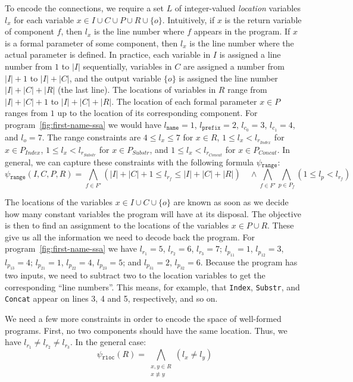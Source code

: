 To encode the connections, we require a set $L$ of integer-valued
\textit{location} variables $l_x$ for each variable $x \in I \cup C \cup P \cup
R \cup \{o\}$. Intuitively, if $x$ is the return variable of component $f$, then
$l_x$ is the line number where $f$ appears in the program. If $x$ is a formal
parameter of some component, then $l_x$ is the line number where the actual
parameter is defined. In practice, each variable in $I$ is assigned a line
number from $1$ to $|I|$ sequentially, variables in $C$ are assigned
a number from $|I| + 1$ to $|I| + |C|$, and the output variable $\{o\}$ is assigned the
line number $|I| + |C| + |R|$ (the last line). The locations of variables in $R$
range from $|I| + |C| + 1$ to $|I| + |C| + |R|$. The location of each formal
parameter $x \in P$ ranges from $1$ up to the location of its corresponding
component.
For program~\ref{fig:first-name-ssa} we would have
$l_{\mathtt{name}} = 1$, $l_{\mathtt{prefix}} = 2$,
$l_{c_0} = 3$, $l_{c_1} = 4$,
and $l_o = 7$.
The range constraints are
$4 \leq l_x \leq 7$ for $x \in R$,
$1 \leq l_x < l_{r_{Index}}$ for $x \in P_{Index}$,
$1 \leq l_x < l_{r_{Substr}}$ for $x \in P_{Substr}$, and
$1 \leq l_x < l_{r_{Concat}}$ for $x \in P_{Concat}$.
In general, we can capture these constraints with the following formula
$\psi{}_{\mathtt{range}}$:
%
\[
  \psi{}_{\mathtt{range}}(I, C, P, R) =
  \bigwedge_{f \in F'} (|I| + |C| + 1 \leq l_{r_f} \leq |I| + |C| + |R|)
  \quad \wedge
  \bigwedge_{f \in F'}
  \bigwedge_{p \in P_f} (1 \leq l_p < l_{r_f})
\]

The locations of the variables $x \in I \cup C \cup \{o\}$ are known as soon as
we decide how many constant variables the program will have at its disposal. The
objective is then to find an assignment to the locations of the variables $x \in
P \cup R$. These give us all the information we need to decode back the program.
For program~\ref{fig:first-name-ssa} we have
$l_{r_1} = 5$, $l_{r_2} = 6$, $l_{r_3} = 7$; $l_{p_{11}} = 1$, $l_{p_{12}} = 3$,
$l_{p_{13}} = 4$; $l_{p_{21}} = 1$, $l_{p_{22}} = 4$, $l_{p_{23}} = 5$; and
$l_{p_{31}} = 2$, $l_{p_{32}} = 6$. Because the program has two inputs, we need
to subtract two to the location variables to get the corresponding ``line
numbers''. This means, for example, that \lstinline{Index}, \lstinline{Substr},
and \lstinline{Concat} appear on lines 3, 4 and 5, respectively, and so on.

We need a few more constraints in order to encode the space of well-formed
programs. First, no two components should have the same location. Thus,
we have $l_{r_1} \neq l_{r_2} \neq l_{r_3}$. In the general case:
%
\[
  \psi{}_{\mathtt{rloc}}(R) =
  \bigwedge_{\substack{x, y \in R\\ x \not\equiv y}} (l_{x} \neq l_{y}) 
\]

